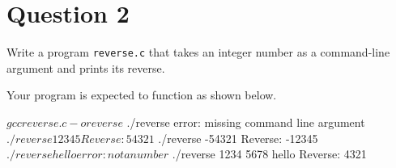 
\section*{Question 2}

Write a program \texttt{reverse.c} that takes an integer number as a command-line argument and prints its reverse.

Your program is expected to function as shown below.

\begin{terminal}
$ gcc reverse.c -o reverse
$ ./reverse
error: missing command line argument
$ ./reverse 12345
Reverse: 54321
$ ./reverse -54321
Reverse: -12345
$ ./reverse hello
error: not a number
$ ./reverse 1234 5678 hello
Reverse: 4321
\end{terminal}
